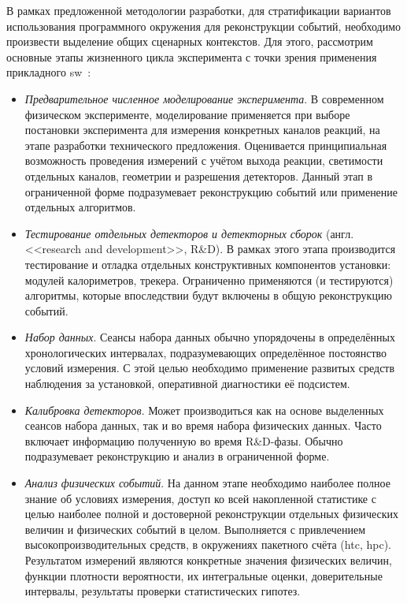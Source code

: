 В рамках предложенной методологии разработки, для стратификации вариантов
использования программного окружения для реконструкции событий, необходимо
произвести выделение общих сценарных контекстов. Для этого, рассмотрим
основные этапы жизненного цикла эксперимента с точки зрения применения
прикладного \acrshort{sw}~\cite{hep-roadmap-Albrecht2019}:
\begin{itemize}
    \item \emph{Предварительное численное моделирование эксперимента}. В
    современном физическом эксперименте, моделирование применяется
    при выборе постановки эксперимента для измерения конкретных
    каналов реакций, на этапе разработки технического предложения.
    Оценивается принципиальная возможность проведения измерений с учётом
    выхода реакции, светимости отдельных каналов, геометрии и разрешения
    детекторов. Данный этап в ограниченной форме подразумевает
    реконструкцию событий или применение отдельных алгоритмов.
    \item \emph{Тестирование отдельных детекторов и детекторных сборок}
    (англ. <<research and development>>, R\&D). В рамках этого этапа
    производится тестирование и отладка отдельных конструктивных
    компонентов установки: модулей калориметров, трекера. Ограниченно
    применяются (и тестируются) алгоритмы, которые впоследствии будут
    включены в общую реконструкцию событий.
    \item \emph{Набор данных}. Сеансы набора данных обычно упорядочены
    в определённых хронологических интервалах, подразумевающих
    определённое постоянство условий измерения. С этой целью
    необходимо применение развитых средств наблюдения за установкой,
    оперативной диагностики её подсистем.
    \item \emph{Калибровка детекторов}. Может производиться как
    на основе выделенных сеансов набора данных, так и во время
    набора физических данных. Часто включает информацию полученную
    во время R\&D-фазы. Обычно подразумевает реконструкцию и анализ
    в ограниченной форме.
    \item \emph{Анализ физических событий}. На данном этапе необходимо
    наиболее полное знание об условиях измерения, доступ ко всей
    накопленной статистике с целью наиболее полной и достоверной
    реконструкции отдельных физических величин и физических событий
    в целом. Выполняется с привлечением высокопроизводительных
    средств, в окружениях пакетного счёта (\acrshort{htc}, \acrshort{hpc}).
    Результатом измерений являются конкретные значения физических величин,
    функции плотности вероятности, их интегральные оценки,
    доверительные интервалы, результаты проверки статистических гипотез.
\end{itemize}

